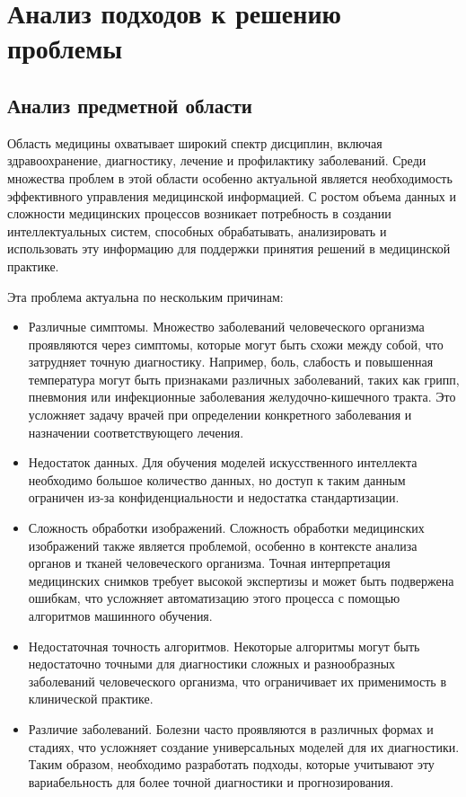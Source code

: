 \section{Анализ подходов к решению проблемы}
\label{sec:analysis}

\subsection{Анализ предметной области}
Область медицины охватывает широкий спектр дисциплин, включая здравоохранение, диагностику, лечение и профилактику заболеваний. Среди множества проблем в этой области особенно актуальной является необходимость эффективного управления медицинской информацией. С ростом объема данных и сложности медицинских процессов возникает потребность в создании интеллектуальных систем, способных обрабатывать, анализировать и использовать эту информацию для поддержки принятия решений в медицинской практике.

Эта проблема актуальна по нескольким причинам:

\begin{itemize}
    \item Различные симптомы. Множество заболеваний человеческого организма проявляются через симптомы, которые могут быть схожи между собой, что затрудняет точную диагностику. Например, боль, слабость и повышенная температура могут быть признаками различных заболеваний, таких как грипп, пневмония или инфекционные заболевания желудочно-кишечного тракта. Это усложняет задачу врачей при определении конкретного заболевания и назначении соответствующего лечения.
    \item Недостаток данных. Для обучения моделей искусственного интеллекта необходимо большое количество данных, но доступ к таким данным ограничен из-за конфиденциальности и недостатка стандартизации.
    \item Сложность обработки изображений. Сложность обработки медицинских изображений также является проблемой, особенно в контексте анализа органов и тканей человеческого организма. Точная интерпретация медицинских снимков требует высокой экспертизы и может быть подвержена ошибкам, что усложняет автоматизацию этого процесса с помощью алгоритмов машинного обучения.
    \item Недостаточная точность алгоритмов. Некоторые алгоритмы могут быть недостаточно точными для диагностики сложных и разнообразных заболеваний человеческого организма, что ограничивает их применимость в клинической практике.
    \item Различие заболеваний. Болезни часто проявляются в различных формах и стадиях, что усложняет создание универсальных моделей для их диагностики. Таким образом, необходимо разработать подходы, которые учитывают эту вариабельность для более точной диагностики и прогнозирования.
\end{itemize}

